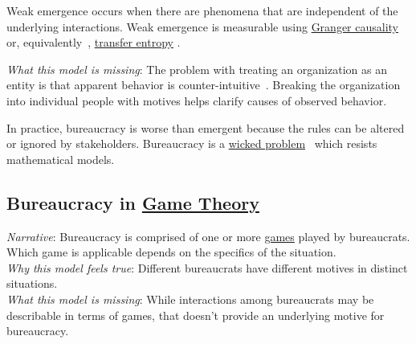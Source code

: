 Weak emergence occurs when there are phenomena that are independent of the underlying interactions. 
Weak emergence is measurable using \href{https://en.wikipedia.org/wiki/Granger_causality}{Granger causality} 
%
or, equivalently~\cite{2009_Barnett},
\href{https://en.wikipedia.org/wiki/Transfer_entropy}{transfer entropy} 
.

\textit{What this model is missing}: The problem with treating an organization as an entity is that apparent behavior is counter-intuitive~\cite{2002_Gall}. Breaking the organization into individual people with motives helps clarify causes of observed behavior. 

In practice, bureaucracy is worse than emergent because the rules can be altered or ignored by  stakeholders. Bureaucracy is a \href{https://en.wikipedia.org/wiki/Wicked_problem}{wicked problem}~\cite{1973_Rittel} 
\iftoggle{WPinmargin}{\marginpar{$>$Wikipedia: wicked problem}}{}
which resists mathematical models. 

\subsection*{Bureaucracy in \href{https://en.wikipedia.org/wiki/Game_theory}{Game Theory}}
\textit{Narrative}: Bureaucracy is comprised of one or more \href{https://en.wikipedia.org/wiki/List_of_games_in_game_theory}{games} 
played by bureaucrats. Which game is applicable depends on the specifics of the situation. \\
\textit{Why this model feels true}: Different bureaucrats have different motives in distinct situations. \\
\textit{What this model is missing}: While interactions among bureaucrats may be describable in terms of games, that doesn't provide an underlying motive for bureaucracy. 

